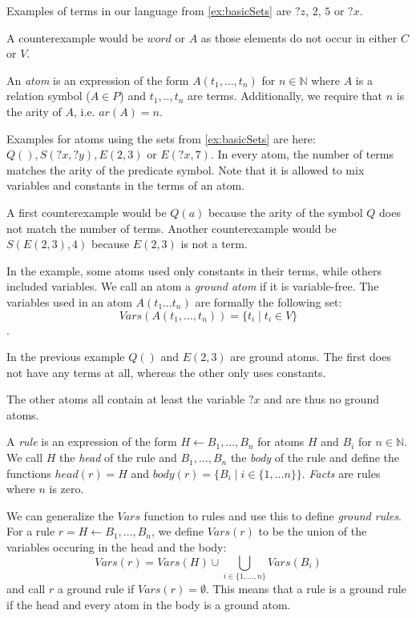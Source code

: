 \begin{example}
    Examples of terms in our language from \cref{ex:basicSets} are $?z$, $2$, $5$ or $?x$.

    A counterexample would be $word$ or $A$ as those elements do not occur in either $C$ or $V$.
\end{example}

An \textit{atom} is an expression of the form $A(t_1,...,t_n)$ for $n \in \mathbb{N}$ where $A$ is a relation symbol ($A \in P$) and $t_1,..,t_n$ are terms. Additionally, we require that $n$ is the arity of $A$, i.e. $ar(A) = n$.

\begin{example}
    Examples for atoms using the sets from \cref{ex:basicSets} are here: $Q(), S(?x,?y), E(2,3)$ or $E(?x, 7)$. In every atom, the number of terms matches the arity of the predicate symbol. Note that it is allowed to mix variables and constants in the terms of an atom.

    A first counterexample would be $Q(a)$ because the arity of the symbol $Q$ does not match the number of terms. 
    Another counterexample would be $S(E(2,3),4)$ because $ E(2,3)$ is not a term.
\end{example}

In the example, some atoms used only constants in their terms, while others included variables. We call an atom a \textit{ground atom} if it is variable-free. The variables used in an atom $A(t_1 \dots t_n)$ are formally the following set: \[Vars(A(t_1,...,t_n)) = \{t_i \mid t_i \in V\}\].

\begin{example}
    In the previous example $Q()$ and $E(2,3)$ are ground atoms. The first does not have any terms at all, whereas the other only uses constants.

    The other atoms all contain at least the variable $?x$ and are thus no ground atoms.
\end{example}

A \textit{rule} is an expression of the form $H \leftarrow B_1 , ... , B_n$ for atoms $H$ and $B_i$ for $n \in \mathbb{N}$. We call $H$ the \textit{head} of the rule and $B_1,..., B_n$ the \textit{body} of the rule and define the functions $head(r) = H$ and $body(r) = \{B_i \mid i \in \{1,\dots n\}\}$. \textit{Facts} are rules where $n$ is zero.

We can generalize the $Vars$ function to rules and use this to define \textit{ground rules}. For a rule $r = H \leftarrow B_1 , ... ,B_n$, we define $Vars(r)$ to be the union of the variables occuring in the head and the body: \[Vars(r) = Vars(H) \cup \bigcup_{i \in \{1,..., n\}} Vars(B_i)\] and call $r$ a ground rule if $Vars(r) = \emptyset$. This means that a rule is a ground rule if the head and every atom in the body is a ground atom.


